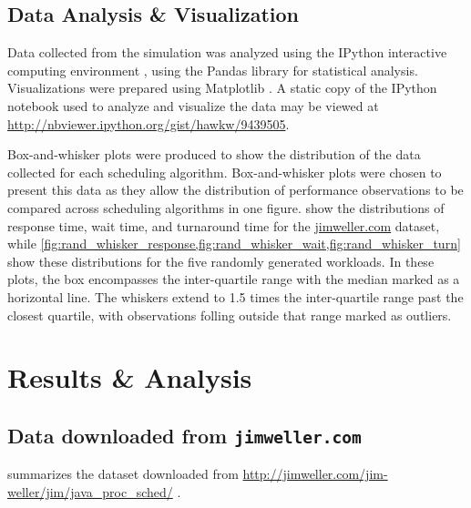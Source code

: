 \documentclass[12pt,letterpaper]{article}
\begin{document}
		\subsection{Data Analysis \& Visualization}
			Data collected from the simulation was analyzed using the IPython interactive computing environment \cite{ipython}, using the Pandas library \cite{ pandas} for statistical analysis. Visualizations were prepared using Matplotlib \cite{matplotlib}. A static copy of the IPython notebook used to analyze and visualize the data may be viewed at \url{http://nbviewer.ipython.org/gist/hawkw/9439505}.

			Box-and-whisker plots were produced to show the distribution of the data collected for each scheduling algorithm. Box-and-whisker plots were chosen to present this data as they allow the distribution of performance observations to be compared across scheduling algorithms in one figure.  show the distributions of response time, wait time, and turnaround time for the \url{jimweller.com} dataset, while \cref{fig:rand_whisker_response,fig:rand_whisker_wait,fig:rand_whisker_turn} show these distributions for the five randomly generated workloads. In these plots, the box encompasses the inter-quartile range with the median marked as a horizontal line. The whiskers extend to 1.5 times the inter-quartile range past the closest quartile, with observations folling outside that range marked as outliers. 

  	\section{Results \& Analysis}

  		\subsection{Data downloaded from \texttt{jimweller.com}}

	  		 summarizes the dataset downloaded from \url{http://jimweller.com/jim-weller/jim/java_proc_sched/} \cite{jimweller}.
\end{document}
